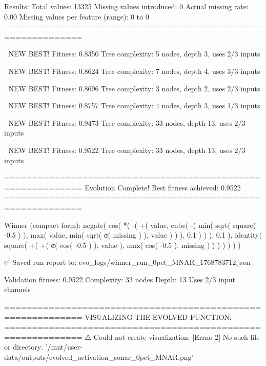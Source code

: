 Results:
  Total values: 13325
  Missing values introduced: 0
  Actual missing rate: 0.00%
  Missing values per feature (range): 0 to 0
============================================================


🎯 NEW BEST! Fitness: 0.8350
Tree complexity: 5 nodes, depth 3, uses 2/3 inputs

🎯 NEW BEST! Fitness: 0.8624
Tree complexity: 7 nodes, depth 4, uses 3/3 inputs

🎯 NEW BEST! Fitness: 0.8696
Tree complexity: 3 nodes, depth 2, uses 2/3 inputs

🎯 NEW BEST! Fitness: 0.8757
Tree complexity: 4 nodes, depth 3, uses 1/3 inputs

🎯 NEW BEST! Fitness: 0.9473
Tree complexity: 33 nodes, depth 13, uses 2/3 inputs

🎯 NEW BEST! Fitness: 0.9522
Tree complexity: 33 nodes, depth 13, uses 2/3 inputs

============================================================
Evolution Complete!
Best fitness achieved: 0.9522
============================================================

Winner (compact form):
 negate(
  cos(
    *(
      -(
        +(
          value,
          cube(
            -(
              min(
                sqrt(
                  square(
                    -0.5
                  )
                ),
                max(
                  value,
                  min(
                    sqrt(
                      σ(
                        missing
                      )
                    ),
                    value
                  )
                )
              ),
              0.1
            )
          )
        ),
        0.1
      ),
      identity(
        square(
          +(
            +(
              σ(
                cos(
                  -0.5
                )
              ),
              value
            ),
            max(
              cos(
                -0.5
              ),
              missing
            )
          )
        )
      )
    )
  )
)

✅ Saved run report to: evo_logs/winner_run_0pct_MNAR_1768783712.json

Validation fitness: 0.9522
Complexity: 33 nodes
Depth: 13
Uses 2/3 input channels

============================================================
VISUALIZING THE EVOLVED FUNCTION:
============================================================
⚠️ Could not create visualization: [Errno 2] No such file or directory: '/mnt/user-data/outputs/evolved_activation_sonar_0pct_MNAR.png'

